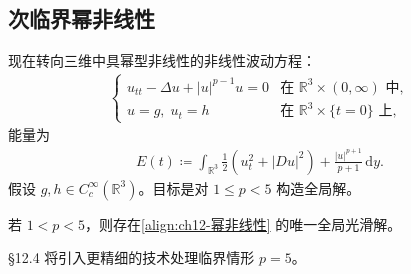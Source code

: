 \documentclass[../../main.tex]{subfiles}
\begin{document}
\subsection{次临界幂非线性}\label{subsection:ch12-次临界幂非线性}

现在转向三维中具幂型非线性的非线性波动方程：
\begin{align}
\begin{cases}
u_{tt}-\Delta u+|u|^{p-1}u=0 & \text{在 } \mathbb{R}^3\times(0,\infty) \text{ 中},\\
u=g,\;u_t=h & \text{在 } \mathbb{R}^3\times\{t=0\} \text{ 上},
\end{cases}
\label{align:ch12-幂非线性}
\end{align}
能量为
\begin{align*}
E(t)\coloneqq\int_{\mathbb{R}^3}\frac{1}{2}(u_t^2+|Du|^2)+\frac{|u|^{p+1}}{p+1}\,\mathrm{d}y.
\end{align*}
假设 $g,h\in C_c^\infty(\mathbb{R}^3)$。目标是对 $1\leqslant p<5$ 构造全局解。

\begin{theorem}[次临界存在定理。]\label{theorem:ch12-次临界存在}若 $1<p<5$，则存在\eqref{align:ch12-幂非线性} 的唯一全局光滑解。
\end{theorem}

\S12.4 将引入更精细的技术处理临界情形 $p=5$。
\end{document}
